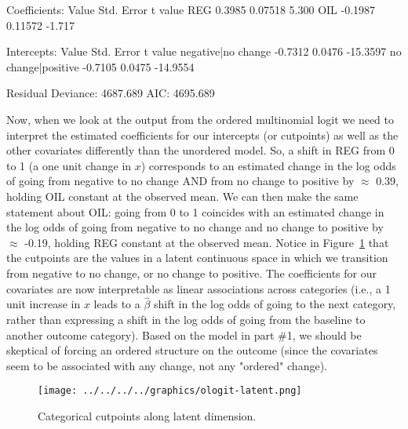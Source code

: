 \documentclass[12pt,letterpaper]{article}
\begin{document}
\begin{enumerate}
	  
	
	\begin{verbnobox}[\footnotesize]
		Coefficients:
		Value Std. Error t value
		REG  0.3985    0.07518   5.300
		OIL -0.1987    0.11572  -1.717
		
		Intercepts:
		Value    Std. Error t value 
		negative|no change  -0.7312   0.0476   -15.3597
		no change|positive  -0.7105   0.0475   -14.9554
		
		Residual Deviance: 4687.689 
		AIC: 4695.689 
	\end{verbnobox}			
	
	\normalsize
	Now, when we look at the output from the ordered multinomial logit we need to interpret the estimated coefficients for our intercepts (or cutpoints) as well as the other covariates differently than the unordered model. So, a shift in REG from 0 to 1 (a one unit change in $x$) corresponds to an estimated change in the log odds of going from negative to no change AND from no change to positive by  $\approx$ 0.39, holding OIL constant at the observed mean. We can then make the same statement about OIL: going from 0 to 1 coincides with an estimated change in the log odds of going from negative to no change and no change to positive by  $\approx$ -0.19, holding REG constant at the observed mean. Notice in Figure~\ref{fig:cutpoints} that the cutpoints are the values in a latent continuous space in which we transition from negative to no change, or no change to positive. The coefficients for our covariates are now interpretable as linear associations across categories (i.e., a 1 unit increase in $x$ leads to a $\hat{\beta}$ shift in the log odds of going to the next category, rather than expressing a shift in the log odds of going from the baseline to another outcome category). Based on the model in part \#1, we should be skeptical of forcing an ordered structure on the outcome (since the covariates seem to be associated with any change, not any "ordered" change).\\
	
	
	\begin{figure}[h!]\centering
		\caption{\footnotesize Categorical cutpoints along latent dimension.}%
		\label{fig:cutpoints}
		
		\texttt{[image: ../../../../graphics/ologit-latent.png]}\\
	\end{figure}
	
\end{enumerate}
\clearpage
\end{document}

